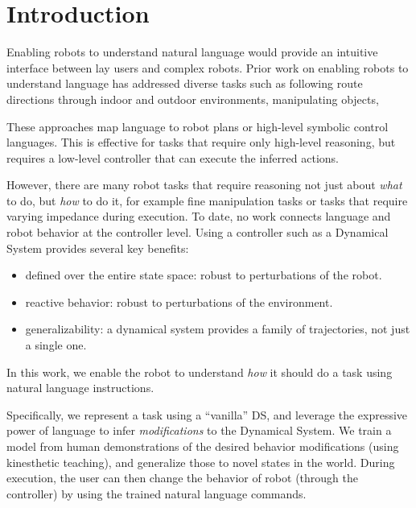\section{Introduction}
\label{secIntroduction}


Enabling robots to understand natural language would provide an intuitive interface between lay users and complex robots.
Prior work on enabling robots to understand language has addressed diverse tasks such as following route directions through indoor and outdoor environments, manipulating objects,


These approaches map language to robot plans or high-level symbolic control languages.
This is effective for tasks that require only high-level reasoning, but requires a low-level controller that can execute the inferred actions.

However, there are many robot tasks that require reasoning not just about \emph{what} to do, but \emph{how} to do it, for example fine manipulation tasks or tasks that require varying impedance during execution.
To date, no work connects language and robot behavior at the controller level.
Using a controller such as a Dynamical System provides several key benefits:
\begin{itemize}
\item defined over the entire state space: robust to perturbations of the robot.
\item reactive behavior: robust to perturbations of the environment.
\item generalizability: a dynamical system provides a family of trajectories, not just a single one.
\end{itemize}



In this work, we enable the robot to understand \emph{how} it should do a task using natural language instructions.

Specifically, we represent a task using a ``vanilla'' DS, and leverage the expressive power of language to infer \emph{modifications} to the Dynamical System.
We train a model from human demonstrations of the desired behavior modifications (using kinesthetic teaching), and generalize those to novel states in the world.
During execution, the user can then change the behavior of robot (through the controller) by using the trained natural language commands.



